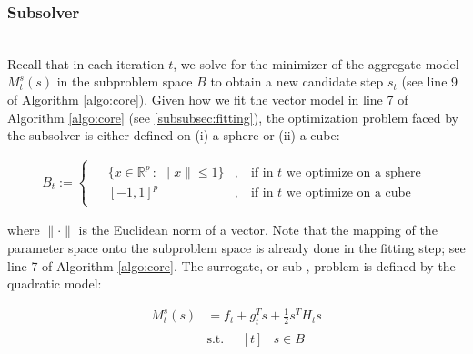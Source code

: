 \subsubsection{Subsolver}
\label{subsubsec:subsolver}
\hfill\\

\noindent Recall that in each iteration $t$, we solve for the minimizer of the aggregate model $M_{t}^{s} (s)$ in the subproblem space $B$ to obtain a new candidate step $s_t$ (see line 9 of Algorithm \ref{algo:core}).
Given how we fit the vector model in line 7 of Algorithm \ref{algo:core} (see \ref{subsubsec:fitting}), the optimization problem faced by the subsolver is either defined on (i) a sphere or (ii) a cube:


\begin{align}
    B_t := \begin{cases}
    \begin{aligned}
        & \{x \in \mathbb{R}^p \, : \, \lVert x \rVert \leq 1 \} & , \ & \text{if  in $t$ we optimize on a sphere} \\
        & [-1, 1]^p & , \ & \text{if in $t$ we optimize on a cube}
    \end{aligned}
    \end{cases}
    \label{eq:ball-metric}
\end{align}

\noindent where $\lVert\cdot\rVert$ is the Euclidean norm of a vector.
Note that the mapping of the parameter space onto the subproblem space is already done in the fitting step; see line 7 of Algorithm \ref{algo:core}.
The surrogate, or sub-, problem is defined by the quadratic model:

\begin{align}
    M_{t}^{s} (s) &= f_t + g_t^T s + \frac{1}{2} s^T H_t s \\
    &\text{s.t.} \quad \begin{aligned}[t]
        & s \in B
    \end{aligned}
    \label{eq:quad-subproblem}
\end{align}


